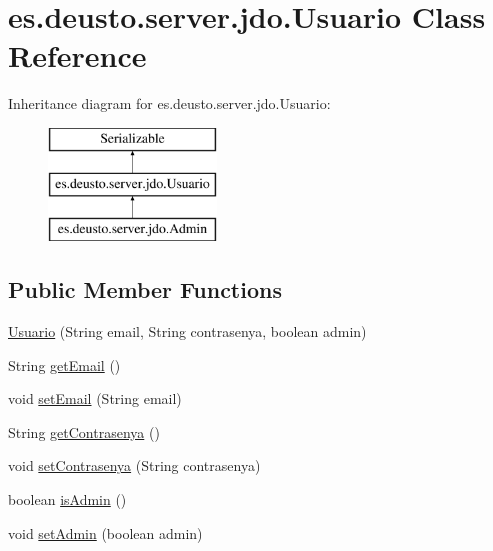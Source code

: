 \hypertarget{classes_1_1deusto_1_1server_1_1jdo_1_1_usuario}{}\section{es.\+deusto.\+server.\+jdo.\+Usuario Class Reference}
\label{classes_1_1deusto_1_1server_1_1jdo_1_1_usuario}
Inheritance diagram for es.\+deusto.\+server.\+jdo.\+Usuario\+:\begin{figure}[H]
\begin{center}
\leavevmode
\includegraphics[height=3.000000cm]{classes_1_1deusto_1_1server_1_1jdo_1_1_usuario}
\end{center}
\end{figure}
\subsection*{Public Member Functions}
\begin{DoxyCompactItemize}
\item 
\mbox{\hyperlink{classes_1_1deusto_1_1server_1_1jdo_1_1_usuario_a36dcf2ec08beb7556dc0fa87021858b4}{Usuario}} (String email, String contrasenya, boolean admin)
\item 
String \mbox{\hyperlink{classes_1_1deusto_1_1server_1_1jdo_1_1_usuario_ae69683ebc51198e0a51b722f899966b1}{get\+Email}} ()
\item 
void \mbox{\hyperlink{classes_1_1deusto_1_1server_1_1jdo_1_1_usuario_a21f39f8557815c50c81baf11b13c666f}{set\+Email}} (String email)
\item 
String \mbox{\hyperlink{classes_1_1deusto_1_1server_1_1jdo_1_1_usuario_a403b76f4c0be066f748d66b418254b69}{get\+Contrasenya}} ()
\item 
void \mbox{\hyperlink{classes_1_1deusto_1_1server_1_1jdo_1_1_usuario_ab2789f5232b3b9c39aa0802c8c231f8b}{set\+Contrasenya}} (String contrasenya)
\item 
boolean \mbox{\hyperlink{classes_1_1deusto_1_1server_1_1jdo_1_1_usuario_af454af693afdc7bad678ab1e24462fc3}{is\+Admin}} ()
\item 
void \mbox{\hyperlink{classes_1_1deusto_1_1server_1_1jdo_1_1_usuario_aa1d1a771be8e17f37076b9f8a29f4cd4}{set\+Admin}} (boolean admin)
\end{DoxyCompactItemize}


